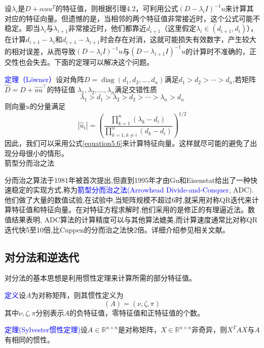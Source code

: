 \documentclass[12pt,a4paper]{article}
\begin{document}
设$\lambda_i$是$D+\alpha uu^T$的特征值，则根据引理4.2，可利用公式$\left(D-\lambda_{i} I\right)^{-1} u$来计算其对应的特征向量。但遗憾的是，当相邻的两个特征值非常接近时，这个公式可能不稳定。即当$\lambda_i$与$\lambda_{i+1}$非常接近时，他们都靠近$d_{i+1}$（这里假定$\lambda_{i} \in\left(d_{i+1}, d_{i}\right)$），在计算$d_{i+1}-\lambda_{i}$和$d_{i+1}-\lambda_{i+1}$时会存在对消，这就可能损失有效数字，产生较大的相对误差，从而导致$\left(D-\lambda_{i} I\right)^{-1} u$与$\left(D-\lambda_{i+1} I\right)^{-1} u$的计算时不准确的，正交性也会失去。下面的定理可以解决这个问题。

\textcolor{blue}{定理（Löwner）}\quad 设对角阵$D=\operatorname{diag}\left(d_{1}, d_{2}, \dots, d_{n}\right)$满足$d_{1}>d_{2}>\cdots>d_n$,若矩阵$\hat{D}=D+\hat{u} \hat{u}^{\top}$的特征值
$\lambda_{1}, \lambda_{2}, \ldots, \lambda_{n}$满足交错性质\begin{equation}
\lambda_{1}>d_{1}>\lambda_{2}>d_{2}>\cdots>\lambda_{n}>d_{n}
\label{equation5.5}
\end{equation}
则向量$\hat{u}$的分量满足\begin{equation}
\left|\hat{u}_{i}\right|=\left(\frac{\prod_{k=1}^{n}\left(\lambda_{k}-d_{i}\right)}{\prod_{k=1, k \neq i}^{n}\left(d_{k}-d_{i}\right)}\right)^{1 / 2}
\label{equation5.6}
\end{equation}
因此，我们可以采用公式\ref{equation5.6}来计算特征向量。这样就尽可能的避免了出现分母很小的情形。\\
箭型分而治之法

分而治之算法于1981年被首次提出,但直到1995年才由Gu和Eisenstat给出了一种快速稳定的实现方式,称为\textcolor{blue}{箭型分而治之法(Arrowhead Divide-and-Conquer}, ADC).他们做了大量的数值试验,在试验中,当矩阵规模不超过6时,就采用对称QR迭代来计算特征值和特征向量。在对特征方程求解时,他们采用的是修正的有理逼近法。数值结果表明, ADC算法的计算精度可以与其他算法媲美,而计算速度通常比对称QR迭代快5至10倍,比Cuppen的分而治之法快2倍。详细介绍参见相关文献。
\subsection{对分法和逆迭代}
对分法的基本思想是利用惯性定理来计算所需的部分特征值。

\textcolor{blue}{定义}\quad 设$A$为对称矩阵，则其惯性定义为$$
(A)=(\nu, \zeta, \pi)
$$
其中$\nu, \zeta, \pi$分别表示$A$的负特征值，零特征值和正特征值的个数。

\textcolor{blue}{定理(Sylvester惯性定理)}\quad 设$A \in \mathbb{R}^{n \times n}$是对称矩阵，$X \in \mathbb{R}^{n \times n}$非奇异，则$X^TAX$与$A$有相同的惯性。
\end{document}

